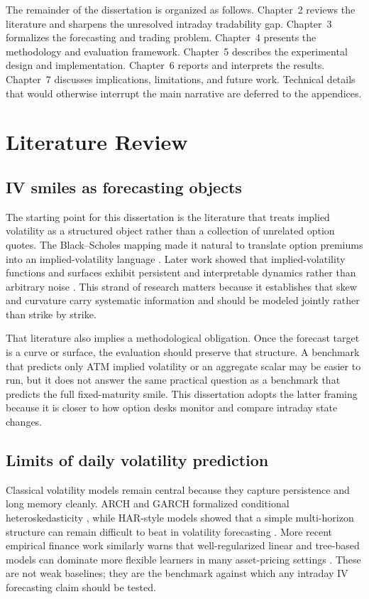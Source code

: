 \documentclass[12pt]{report}
\begin{document}
The remainder of the dissertation is organized as follows. Chapter~2 reviews the literature and sharpens the unresolved intraday tradability gap. Chapter~3 formalizes the forecasting and trading problem. Chapter~4 presents the methodology and evaluation framework. Chapter~5 describes the experimental design and implementation. Chapter~6 reports and interprets the results. Chapter~7 discusses implications, limitations, and future work. Technical details that would otherwise interrupt the main narrative are deferred to the appendices.

\chapter{Literature Review}

\section{IV smiles as forecasting objects}
The starting point for this dissertation is the literature that treats implied volatility as a structured object rather than a collection of unrelated option quotes. The Black--Scholes mapping made it natural to translate option premiums into an implied-volatility language \citep{black1973}. Later work showed that implied-volatility functions and surfaces exhibit persistent and interpretable dynamics rather than arbitrary noise \citep{dumas1998,cont2002dynamics}. This strand of research matters because it establishes that skew and curvature carry systematic information and should be modeled jointly rather than strike by strike.

That literature also implies a methodological obligation. Once the forecast target is a curve or surface, the evaluation should preserve that structure. A benchmark that predicts only ATM implied volatility or an aggregate scalar may be easier to run, but it does not answer the same practical question as a benchmark that predicts the full fixed-maturity smile. This dissertation adopts the latter framing because it is closer to how option desks monitor and compare intraday state changes.

\section{Limits of daily volatility prediction}
Classical volatility models remain central because they capture persistence and long memory cleanly. ARCH and GARCH formalized conditional heteroskedasticity \citep{engle1982,bollerslev1986}, while HAR-style models showed that a simple multi-horizon structure can remain difficult to beat in volatility forecasting \citep{corsi2009}. More recent empirical finance work similarly warns that well-regularized linear and tree-based models can dominate more flexible learners in many asset-pricing settings \citep{gu2020,heaton2017}. These are not weak baselines; they are the benchmark against which any intraday IV forecasting claim should be tested.
\end{document}
